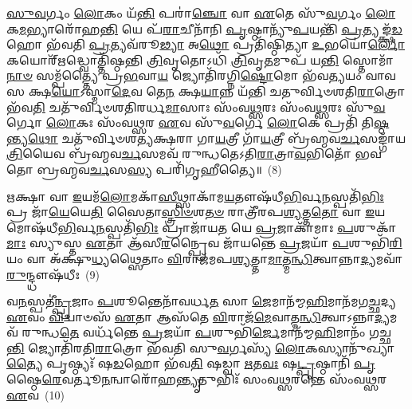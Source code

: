 \-\ul{𑌸𑍁}\-\-\ul{𑌵}\-𑌰𑍍𑌗𑌂 \ul{𑌲𑍋}\-𑌕𑌂 𑌯᳴\-\ul{𑌨𑍍𑌤𑌿} 𑌪𑌰𑌾॑\-\ul{𑌞𑍍𑌚𑍋} 𑌵𑌾 \ul{𑌏}\-𑌤𑍇 𑌸𑍁᳴\-\ul{𑌵}\-𑌰𑍍𑌗𑌂 \ul{𑌲𑍋}\-𑌕\-\ul{𑌮}\-𑌭𑍍𑌯𑌾𑌰𑍋᳴𑌹\-\ul{𑌨𑍍𑌤𑌿} 𑌯𑍇 𑌪᳴\-\ul{𑌰𑌾}\-𑌚𑍀𑌨𑌾᳴𑌨𑌿 \ul{𑌪𑍃}\-𑌷𑍍𑌠𑌾𑌨𑍍𑌯𑍁᳴\-\ul{𑌪}\-𑌯𑌨𑍍𑌤𑌿᳴ \ul{𑌪𑍍𑌰}\-𑌤𑍍𑌯𑌙𑍍𑌕𑍍𑌷᳴\-\ul{𑌡}\-𑌹𑍋 𑌭᳴𑌵𑌤𑌿 \ul{𑌪𑍍𑌰}\-𑌤𑍍𑌯𑌵᳴𑌰𑍂\-\ul{𑌢𑍍𑌯𑌾} 𑌅\-\ul{𑌥𑍋} 𑌪𑍍𑌰𑌤𑌿᳴𑌷𑍍𑌠𑌿𑌤𑍍𑌯𑌾 \ul{𑌉}\-𑌭𑌯𑍋॑\-\ul{𑌰𑍍𑌲𑍋}\-𑌕𑌯𑍋𑌰𑍍\mbox{}᳴\-\ul{𑌋}\-𑌦𑍍𑌧𑍍𑌵𑍋𑌤𑍍𑌤𑌿᳴𑌷𑍍𑌠𑌨𑍍𑌤𑌿 \ul{𑌤𑍍𑌰𑌿}\-𑌵𑍃𑌤𑍋\-𑌽𑌧𑌿᳴ \ul{𑌤𑍍𑌰𑌿}\-𑌵𑍃\-\ul{𑌤}\-𑌮𑍁𑌪᳴ 𑌯\-\ul{𑌨𑍍𑌤𑌿} 𑌸𑍍𑌤𑍋𑌮𑌾᳴\-\ul{𑌨𑌾}\-\-\ul{𑍞} 𑌸𑌮𑍍𑌪᳴𑌤𑍍𑌤𑍍𑌯𑍈 𑌪𑍍𑌰\-\ul{𑌭}\-𑌵𑌾\-\ul{𑌯} 𑌜𑍍𑌯𑍋𑌤𑌿᳴𑌰𑌗𑍍𑌨𑌿\-\ul{𑌷𑍍𑌟𑍋}\-𑌮𑍋 𑌭᳴𑌵\-\ul{𑌤𑍍𑌯}\-𑌯𑌂 𑌵𑌾𑌵 𑌸 𑌕𑍍𑌷\-\ul{𑌯𑍋}\-\-𑌽𑌸𑍍𑌮𑌾\-\ul{𑌦𑍇}\-𑌵 𑌤𑍇\-\ul{𑌨} 𑌕𑍍𑌷\-\ul{𑌯𑌾}\-𑌨𑍍𑌨 𑌯᳴𑌨𑍍𑌤𑌿 𑌚𑌤𑍁𑌰𑍍𑌵𑌿𑍞𑌶𑌤𑌿\-\ul{𑌰𑌾}\-𑌤𑍍𑌰𑍋 𑌭᳴𑌵\-\ul{𑌤𑌿} 𑌚𑌤𑍁᳴𑌰𑍍𑌵𑌿𑍞𑌶𑌤𑌿𑌰𑌰𑍍𑌧\-\ul{𑌮𑌾}\-𑌸𑌾𑌃 𑌸𑌂᳴𑌵\-\ul{𑌥𑍍𑌸}\-𑌰𑌃 𑌸𑌂᳴𑌵\-\ul{𑌥𑍍𑌸}\-𑌰𑌃 𑌸𑍁᳴\-\ul{𑌵}\-𑌰𑍍𑌗𑍋 \ul{𑌲𑍋}\-𑌕𑌃 𑌸𑌂᳴𑌵\-\ul{𑌥𑍍𑌸}\-𑌰 \ul{𑌏}\-𑌵 𑌸𑍁᳴\-\ul{𑌵}\-𑌰𑍍𑌗𑍇 \ul{𑌲𑍋}\-𑌕𑍇 𑌪𑍍𑌰𑌤𑌿᳴ 𑌤𑌿\-\ul{𑌷𑍍𑌠}\-𑌨𑍍𑌤𑍍𑌯\-\ul{𑌥𑍋} 𑌚𑌤𑍁᳴𑌰𑍍𑌵𑌿𑍞𑌶𑌤𑍍𑌯𑌕𑍍𑌷𑌰𑌾 𑌗𑌾\-\ul{𑌯}\-𑌤𑍍𑌰𑍀 𑌗𑌾᳴\-\ul{𑌯}\-𑌤𑍍𑌰𑍀 𑌬𑍍𑌰᳴𑌹𑍍𑌮𑌵\-\ul{𑌰𑍍𑌚}\-𑌸𑌙𑍍𑌗𑌾᳴𑌯\-\ul{𑌤𑍍𑌰𑌿}\-𑌯𑍈𑌵 𑌬𑍍𑌰᳴𑌹𑍍𑌮𑌵\-\ul{𑌰𑍍𑌚}\-𑌸𑌮𑌵᳴ 𑌰𑍁𑌨𑍍𑌧𑌤𑍇\-𑌽𑌤𑌿\-\ul{𑌰𑌾}\-𑌤𑍍𑌰𑌾\-\ul{𑌵}\-𑌭𑌿𑌤𑍋᳴ 𑌭𑌵𑌤𑍋 𑌬𑍍𑌰𑌹𑍍𑌮𑌵\-\ul{𑌰𑍍𑌚}\-𑌸\-\ul{𑌸𑍍𑌯} 𑌪𑌰𑌿᳴𑌗𑍃𑌹𑍀𑌤𑍍𑌯𑍈॥~(8)

{\anuvakamend[{\-\ul{𑌮}\-\-\ul{𑌨𑍁}\-𑌷𑍍𑌯᳴𑌸𑍍𑌯 𑌮\-\ul{𑌧𑍍𑌯}\-𑌤𑌃 \ul{𑌪}\-𑌶\-\ul{𑌵}\-𑌸𑍍𑌤𑌾𑌭𑍍𑌯𑌾᳴\-\ul{𑌮𑍇}\-𑌵 𑌸𑌂᳴𑌵\-\ul{𑌥𑍍𑌸}\-𑌰𑌶𑍍𑌚𑌤𑍁᳴𑌰𑍍𑌵𑌿𑍞𑌶𑌤𑌿𑌶𑍍𑌚}]}%

\-\ul{𑌋}\-𑌕𑍍𑌷𑌾 𑌵𑌾 \ul{𑌇}\-𑌯𑌮᳴\-\ul{𑌲𑍋}\-𑌮𑌕𑌾᳴\-\ul{𑌸𑍀}\-𑌥𑍍𑌸𑌾𑌕𑌾᳴𑌮\-\ul{𑌯}\-𑌤𑍗𑌷᳴𑌧𑍀\-\ul{𑌭𑌿}\-𑌰𑍍𑌵\-\ul{𑌨}\-𑌸𑍍𑌪𑌤𑌿᳴\-\ul{𑌭𑌿𑌃} 𑌪𑍍𑌰 𑌜𑌾᳴\-\ul{𑌯𑍇}\-𑌯𑍇\-\ul{𑌤𑌿} 𑌸𑍈𑌤𑌾\-\ul{𑌸𑍍𑌤𑍍𑌰𑌿}\-\-\ul{𑍞}\-𑌶\-\ul{𑌤}\-\-\ul{𑍞} 𑌰𑌾𑌤𑍍𑌰𑍀᳴𑌰𑌪\-\ul{𑌶𑍍𑌯}\-𑌤𑍍𑌤\-\ul{𑌤𑍋} 𑌵𑌾 \ul{𑌇}\-𑌯𑌮𑍋𑌷᳴𑌧𑍀\-\ul{𑌭𑌿}\-𑌰𑍍𑌵\-\ul{𑌨}\-𑌸𑍍𑌪𑌤𑌿᳴\-\ul{𑌭𑌿𑌃} 𑌪𑍍𑌰𑌾𑌜𑌾᳴𑌯\-\ul{𑌤} 𑌯𑍇 \ul{𑌪𑍍𑌰}\-𑌜𑌾𑌕𑌾᳴𑌮𑌾𑌃 \ul{𑌪}\-𑌶𑍁𑌕𑌾᳴\-\ul{𑌮𑌾𑌃} 𑌸𑍍𑌯𑍁𑌸𑍍𑌤 \ul{𑌏}\-𑌤𑌾 𑌆᳴𑌸𑍀\-\ul{𑌰}\-𑌨𑍍𑌪𑍍𑌰𑍈𑌵 𑌜𑌾᳴𑌯𑌨𑍍𑌤𑍇 \ul{𑌪𑍍𑌰}\-𑌜𑌯𑌾᳴ \ul{𑌪}\-𑌶𑍁𑌭𑌿᳴\-\ul{𑌰𑌿}\-𑌯𑌂 𑌵𑌾 𑌅᳴𑌕𑍍𑌷𑍁\-\ul{𑌧𑍍𑌯}\-𑌥𑍍𑌸𑍈𑌤𑌾𑌂 \ul{𑌵𑌿}\-𑌰𑌾𑌜᳴𑌮𑌪\-\ul{𑌶𑍍𑌯}\-𑌤𑍍𑌤𑌾\-\ul{𑌮𑌾}\-𑌤𑍍𑌮\-\ul{𑌨𑍍𑌧𑌿}\-𑌤𑍍𑌵𑌾𑌨𑍍𑌨𑌾\-\ul{𑌦𑍍𑌯}\-𑌮𑌵𑌾᳴\-\ul{𑌰𑍁}\-𑌨𑍍𑌦𑍍𑌧𑍗𑌷᳴𑌧𑍀𑌃~(9)

𑌵\-\ul{𑌨}\-𑌸𑍍𑌪𑌤𑍀॑\-\ul{𑌨𑍍𑌪𑍍𑌰}\-𑌜𑌾𑌂 \ul{𑌪}\-𑌶𑍂𑌨𑍍𑌤𑍇𑌨𑌾᳴𑌵𑌰𑍍𑌧\-\ul{𑌤} 𑌸𑌾 \ul{𑌜𑍇}\-𑌮𑌾𑌨᳴𑌮𑍍𑌮\-\ul{𑌹𑌿}\-𑌮𑌾𑌨᳴𑌮𑌗\-\ul{𑌚𑍍𑌛}\-𑌦𑍍𑌯 \ul{𑌏}\-𑌵𑌂 \ul{𑌵𑌿}\-𑌦𑍍𑌵𑌾𑍞𑌸᳴ \ul{𑌏}\-𑌤𑌾 𑌆𑌸᳴𑌤𑍇 \ul{𑌵𑌿}\-𑌰𑌾𑌜᳴\-\ul{𑌮𑍇}\-𑌵𑌾𑌤𑍍𑌮\-\ul{𑌨𑍍𑌧𑌿}\-𑌤𑍍𑌵𑌾\-𑌽𑌨𑍍𑌨𑌾\-\ul{𑌦𑍍𑌯}\-𑌮𑌵᳴ 𑌰𑍁𑌨𑍍𑌧\-\ul{𑌤𑍇} 𑌵𑌰𑍍𑌧᳴𑌨𑍍𑌤𑍇 \ul{𑌪𑍍𑌰}\-𑌜𑌯𑌾᳴ \ul{𑌪}\-𑌶𑍁𑌭𑌿᳴\-\ul{𑌰𑍍𑌜𑍇}\-𑌮𑌾𑌨᳴𑌮𑍍𑌮\-\ul{𑌹𑌿}\-𑌮𑌾𑌨𑌂᳴ 𑌗𑌚𑍍𑌛\-\ul{𑌨𑍍𑌤𑌿} 𑌜𑍍𑌯𑍋𑌤𑌿᳴𑌰𑌤𑌿\-\ul{𑌰𑌾}\-𑌤𑍍𑌰𑍋 𑌭᳴𑌵𑌤𑌿 𑌸𑍁\-\ul{𑌵}\-𑌰𑍍𑌗𑌸𑍍𑌯᳴ \ul{𑌲𑍋}\-𑌕𑌸𑍍𑌯𑌾𑌨𑍁᳴\-𑌖𑍍𑌯𑌾\-\ul{𑌤𑍍𑌯𑍈} 𑌪𑍃𑌷𑍍𑌠𑍍𑌯𑌃᳴ 𑌷\-\ul{𑌡}\-𑌹𑍋 𑌭᳴𑌵\-\ul{𑌤𑌿} 𑌷𑌡𑍍𑌵𑌾 \ul{𑌋}\-𑌤\-\ul{𑌵𑌃} 𑌷\-\ul{𑌟𑍍𑌪𑍃}\-𑌷𑍍𑌠𑌾𑌨𑌿᳴ \ul{𑌪𑍃}\-𑌷𑍍𑌠𑍈\-\ul{𑌰𑍇}\-𑌵𑌰𑍍𑌤𑍂\-\ul{𑌨}\-𑌨𑍍𑌵𑌾𑌰𑍋᳴𑌹\-\ul{𑌨𑍍𑌤𑍍𑌯𑍃}\-𑌤𑍁𑌭𑌿𑌃᳴ 𑌸𑌂𑌵\-\ul{𑌥𑍍𑌸}\-𑌰𑌨𑍍𑌤𑍇 𑌸𑌂᳴𑌵\-\ul{𑌥𑍍𑌸}\-𑌰 \ul{𑌏}\-𑌵~(10)

